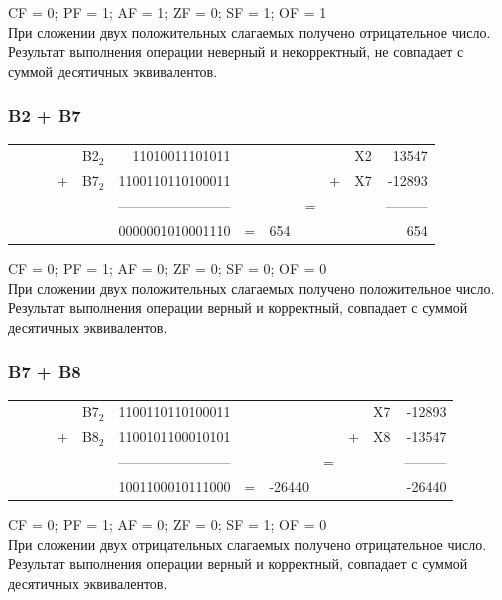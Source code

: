 \documentclass[11pt]{article}
\begin{document}
CF = 0; PF = 1; AF = 1; ZF = 0; SF = 1; OF = 1\\
При сложении двух положительных слагаемых получено отрицательное число. Результат выполнения операции неверный и некорректный, не совпадает с суммой десятичных эквивалентов.

\subsubsection{B2 + B7}
\label{sec:org6b160de}
\setlength{\tabcolsep}{3pt}
\label{tab:orgfd75604}
\begin{tabular}{lllllrlllllr}
 &  &  &  & B2\(_{\text{2}}\) & 11010011101011 &  &  &  &  & X2 & 13547\\
 &  &  & + & B7\(_{\text{2}}\) & 1100110110100011 &  &  &  & + & X7 & -12893\\
 &  &  &  &  & ------------------------ &  &  & = &  &  & ---------\\
 &  &  &  &  & 0000001010001110 & = & 654 &  &  &  & 654\\
\end{tabular}

CF = 0; PF = 1; AF = 0; ZF = 0; SF = 0; OF = 0\\
При сложении двух положительных слагаемых получено положительное число. Результат выполнения операции верный и корректный, совпадает с суммой десятичных эквивалентов.

\subsubsection{B7 + B8}
\label{sec:orgf5beef2}
\setlength{\tabcolsep}{3pt}
\label{tab:org4065ec1}
\begin{tabular}{lllllrlllllr}
 &  &  &  & B7\(_{\text{2}}\) & 1100110110100011 &  &  &  &  & X7 & -12893\\
 &  &  & + & B8\(_{\text{2}}\) & 1100101100010101 &  &  &  & + & X8 & -13547\\
 &  &  &  &  & ------------------------ &  &  & = &  &  & ---------\\
 &  &  &  &  & 1001100010111000 & = & -26440 &  &  &  & -26440\\
\end{tabular}

CF = 0; PF = 1; AF = 0; ZF = 0; SF = 1; OF = 0\\
При сложении двух отрицательных слагаемых получено отрицательное число. Результат выполнения операции верный и корректный, совпадает с суммой десятичных эквивалентов.
\end{document}
